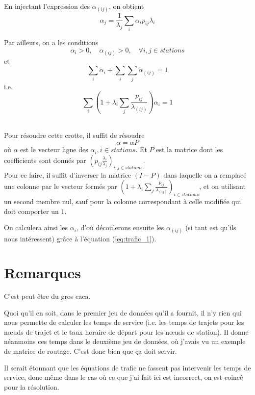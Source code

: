 \documentclass[12pt,a4paper]{article}
\begin{document}
En injectant l'expression des $\alpha_{(ij)}$, on obtient
\begin{equation}
\alpha_j = \frac{1}{\lambda_j} \sum_i \alpha_i p_{ij} \lambda_i
\end{equation}


Par ailleurs, on a les conditions
\[
\alpha_i > 0, \quad \alpha_{(ij)} >0, \quad \forall i,j \in stations 
\]
et
\begin{equation}
\sum_i \alpha_i + \sum_i \sum_j \alpha_{(ij)} = 1
\end{equation}
i.e.
\begin{equation}
\sum_i \left(1 + \lambda_i \sum_j \frac{p_{ij}}{\lambda_{(ij)}} \right) \alpha_i = 1
\end{equation}

~\\
Pour résoudre cette crotte, il suffit de résoudre
\begin{equation}
\alpha = \alpha P
\end{equation}
où $\alpha$ est le vecteur ligne des $\alpha_i, i \in stations$. Et $P$ est la matrice dont les coefficients sont donnés par $\left( p_{ij} \frac{\lambda_i}{\lambda_j} \right)_{i,j \in stations}$.\\

Pour ce faire, il suffit d'inverser la matrice $(I-P)$ dans laquelle on a remplacé une colonne par le vecteur formés par $\left(1 + \lambda_i \sum_j \frac{p_{ij}}{\lambda_{(ij)}} \right)_{i \in stations}$, et on utilisant un second membre nul, sauf pour la colonne correspondant à celle modifiée qui doit comporter un $1$.
 
On calculera ainsi les $\alpha_i$, d'où découlerons ensuite les $\alpha_{(ij)}$ (si tant est qu'ils nous intéressent) grâce à l'équation (\ref{eq:trafic_1}).



\section{Remarques}

C'est peut être du gros caca.

Quoi qu'il en soit, dans le premier jeu de données qu'il a fournit, il n'y rien qui nous permette de calculer les temps de service (i.e. les temps de trajets pour les nœuds de trajet et le taux horaire de départ pour les nœuds de station). Il donne néanmoins ces temps dans le deuxième jeu de données, où j'avais vu un exemple de matrice de routage. C'est donc bien que ça doit servir.

Il serait étonnant que les équations de trafic ne fassent pas intervenir les temps de service, donc même dans le cas où ce que j'ai fait ici est incorrect, on est coincé pour la résolution.
\end{document}

